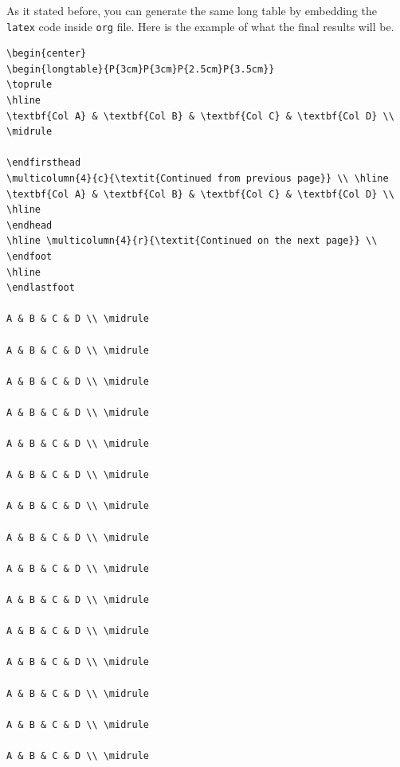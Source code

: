 \documentclass[12pt]{report}
\numberwithin{equation}{section}
\begin{document}
\begin{appendix}
As it stated before, you can generate the same long table by embedding the
\texttt{latex} code inside \texttt{org} file. Here is the example of what the final results
will be.

\begin{verbatim}
\begin{center}
\begin{longtable}{P{3cm}P{3cm}P{2.5cm}P{3.5cm}}
\toprule
\hline
\textbf{Col A} & \textbf{Col B} & \textbf{Col C} & \textbf{Col D} \\ \midrule

\endfirsthead
\multicolumn{4}{c}{\textit{Continued from previous page}} \\ \hline
\textbf{Col A} & \textbf{Col B} & \textbf{Col C} & \textbf{Col D} \\ \hline
\endhead
\hline \multicolumn{4}{r}{\textit{Continued on the next page}} \\
\endfoot
\hline
\endlastfoot

A & B & C & D \\ \midrule

A & B & C & D \\ \midrule

A & B & C & D \\ \midrule

A & B & C & D \\ \midrule

A & B & C & D \\ \midrule

A & B & C & D \\ \midrule

A & B & C & D \\ \midrule

A & B & C & D \\ \midrule

A & B & C & D \\ \midrule

A & B & C & D \\ \midrule

A & B & C & D \\ \midrule

A & B & C & D \\ \midrule

A & B & C & D \\ \midrule

A & B & C & D \\ \midrule

A & B & C & D \\ \midrule


\end{verbatim}
\end{appendix}
\end{document}
